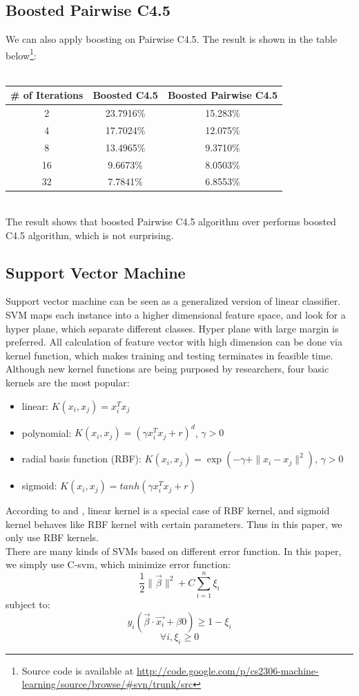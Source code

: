 \documentclass[a4paper,11pt]{article}
\begin{document}
\subsection{Boosted Pairwise C4.5}
We can also apply boosting on Pairwise C4.5. The result is shown in the table below\footnote{Source code is available at \url{http://code.google.com/p/cs2306-machine-learning/source/browse/#svn/trunk/src}}:\\
\vspace{0.5cm}\\
\begin{tabular}{c c c}
\# of Iterations	& Boosted C4.5 & Boosted Pairwise C4.5\\
\hline \hline
	2		& 23.7916\% & 15.283\%  \\
	4		& 17.7024\% & 12.075\%  \\
	8		& 13.4965\% & 9.3710\%  \\
	16		& 9.6673\%  & 8.0503\%  \\
    32      & 7.7841\%  & 6.8553\%\\
\end{tabular}
\vspace{0.5cm}\\
The result shows that boosted Pairwise C4.5 algorithm over performs boosted C4.5 algorithm, which is not surprising.\\

\subsection{Support Vector Machine}
Support vector machine can be seen as a generalized version of linear classifier. SVM maps each instance into a higher dimensional feature space, and look for a hyper plane, which separate different classes. Hyper plane with large margin is preferred. All calculation of feature vector with high dimension can be done via kernel function, which makes training and testing terminates in feasible time. Although new kernel functions are being purposed by researchers, four basic kernels are the most popular\cite{SVM}:
\begin{itemize}
\item linear: $K(x_i,x_j)=x_i^Tx_j$\\
\item polynomial: $K(x_i,x_j)=(\gamma x_i^Tx_j+r)^d$, $\gamma >0$\\
\item radial basis function (RBF): $K(x_i,x_j)=\exp(-\gamma + \|x_i-x_j\|^2)$, $\gamma > 0$\\
\item sigmoid: $K(x_i,x_j)=tanh(\gamma x_i^Tx_j+r)$\\
\end{itemize}
According to \cite{SSK} and \cite{LL}, linear kernel is a special case of RBF kernel, and sigmoid kernel behaves like RBF kernel with certain parameters. Thus in this paper, we only use RBF kernels.\\
There are many kinds of SVMs based on different error function. In this paper, we simply use C-svm, which minimize error function:
    $$\frac{1}{2}\|\vec{\beta}\|^2+C\sum_{i=1}^n \xi_i$$
 subject to:$$y_i(\vec{\beta}\cdot \vec{x_i}+\beta{0})\geq 1-\xi_i$$$$\forall i, \xi_i\geq 0$$
\end{document}
